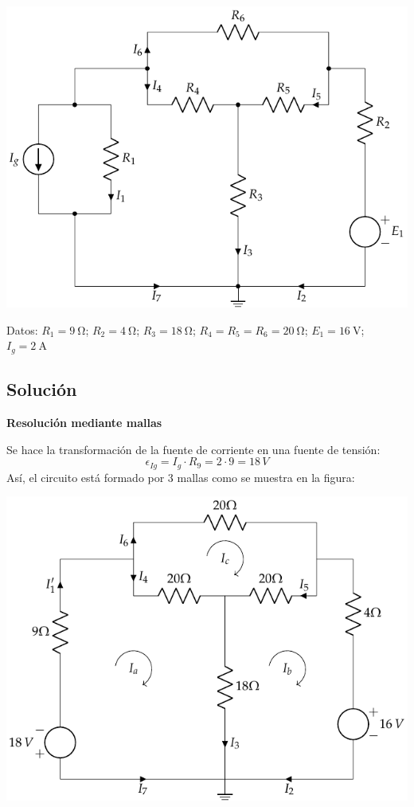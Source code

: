      \begin{center}
       \includegraphics{figuras/BT1_12.pdf}
     \end{center}

     Datos: $R_1 = \qty{9}{\ohm}$; $R_2 = \qty{4}{\ohm}$; $R_3 = \qty{18}{\ohm}$; $R_4 = R_5 = R_6 = \qty{20}{\ohm}$; $E_1 = \qty{16}{\volt}$; $I_g = \qty{2}{\ampere}$

     \subsection*{Solución}

     \textbf{Resolución mediante mallas}

     Se hace la transformación de la fuente de corriente en una fuente
     de tensión:
     \begin{equation*}
       \epsilon_{Ig}=I_g\cdot R_9=2\cdot 9=18\,V
     \end{equation*}
     Así, el circuito está formado por 3 mallas como se muestra en la
     figura:
     \begin{center}
       \includegraphics{figuras/BT1_12_mallas.pdf}
     \end{center}
     
